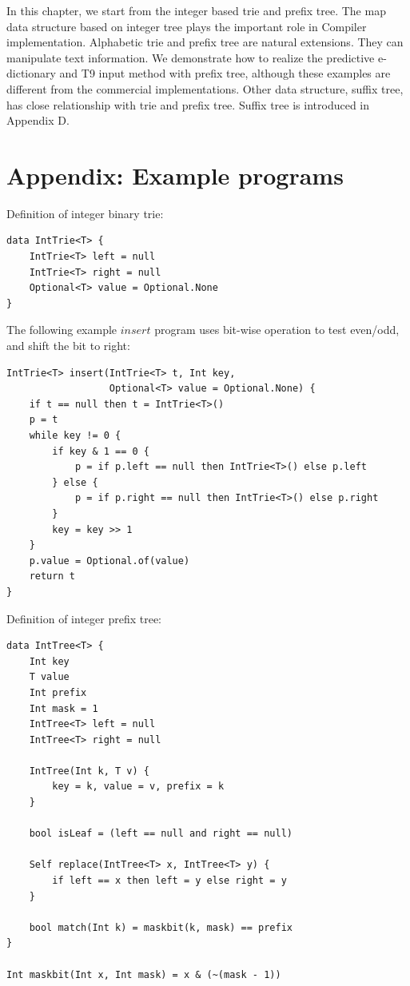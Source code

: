 \documentclass[b5paper]{article}
\begin{document}
In this chapter, we start from the integer based trie and prefix tree. The
map data structure based on integer tree plays the important role
in Compiler implementation. Alphabetic trie and prefix tree are
natural extensions. They can manipulate text information.
We demonstrate how to realize the predictive e-dictionary
and T9 input method with prefix tree, although these examples
are different from the commercial implementations.
Other data structure, suffix tree, has close
relationship with trie and prefix tree. Suffix tree is introduced
in Appendix D.

\section{Appendix: Example programs}

Definition of integer binary trie:

\begin{lstlisting}[language = Bourbaki]
data IntTrie<T> {
    IntTrie<T> left = null
    IntTrie<T> right = null
    Optional<T> value = Optional.None
}
\end{lstlisting}

The following example $insert$ program uses bit-wise operation to test even/odd, and shift the bit to right:

\begin{lstlisting}[language = Bourbaki]
IntTrie<T> insert(IntTrie<T> t, Int key,
                  Optional<T> value = Optional.None) {
    if t == null then t = IntTrie<T>()
    p = t
    while key != 0 {
        if key & 1 == 0 {
            p = if p.left == null then IntTrie<T>() else p.left
        } else {
            p = if p.right == null then IntTrie<T>() else p.right
        }
        key = key >> 1
    }
    p.value = Optional.of(value)
    return t
}
\end{lstlisting}



Definition of integer prefix tree:

\begin{lstlisting}[language = Bourbaki]
data IntTree<T> {
    Int key
    T value
    Int prefix
    Int mask = 1
    IntTree<T> left = null
    IntTree<T> right = null

    IntTree(Int k, T v) {
        key = k, value = v, prefix = k
    }

    bool isLeaf = (left == null and right == null)

    Self replace(IntTree<T> x, IntTree<T> y) {
        if left == x then left = y else right = y
    }

    bool match(Int k) = maskbit(k, mask) == prefix
}

Int maskbit(Int x, Int mask) = x & (~(mask - 1))
\end{lstlisting}
\end{document}
